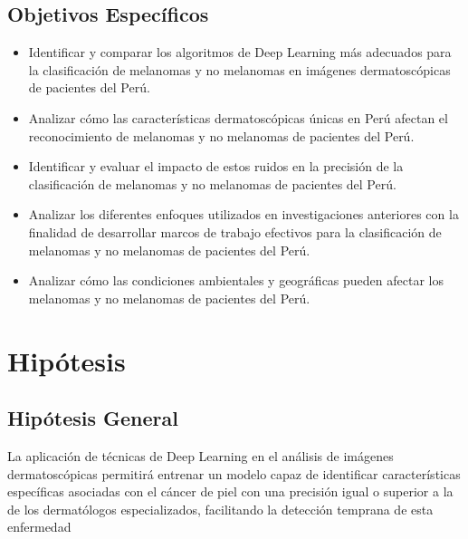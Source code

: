 \subsection{Objetivos Espec\'{i}ficos}
\newcommand{\Objone}{
Identificar y comparar los algoritmos de Deep Learning más adecuados para la clasificación de melanomas y no melanomas en imágenes dermatoscópicas de pacientes del Perú.
}
\newcommand{\Objtwo}{
Analizar cómo las características dermatoscópicas únicas en Perú afectan el reconocimiento de melanomas y no melanomas de pacientes del Perú.
}
\newcommand{\Objthree}{
Identificar y evaluar el impacto de estos ruidos en la precisión de la clasificación de melanomas y no melanomas de pacientes del Perú.
}
\newcommand{\Objfour}{
Analizar los diferentes enfoques utilizados en investigaciones anteriores con la finalidad de desarrollar marcos de trabajo efectivos para la clasificación de melanomas y no melanomas de pacientes del Perú.
}
\newcommand{\Objfive}{
Analizar cómo las condiciones ambientales y geográficas pueden afectar los melanomas y no melanomas de pacientes del Perú.
}

\begin{itemize}
	\item {\Objone}
	\item {\Objtwo}
	\item {\Objthree}
	\item {\Objfour}
	\item {\Objfive}
\end{itemize}


\section{Hipótesis}

\subsection{Hipótesis General}
\newcommand{\HipotesisGeneral}{
La aplicación de técnicas de Deep Learning en el análisis de imágenes dermatoscópicas permitirá entrenar un modelo capaz de identificar características específicas asociadas con el cáncer de piel con una precisión igual o superior a la de los dermatólogos especializados, facilitando la detección temprana de esta enfermedad

}
\HipotesisGeneral

